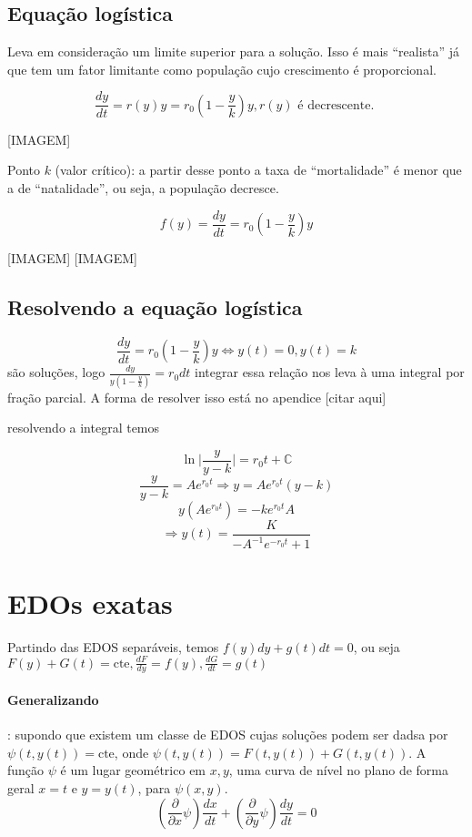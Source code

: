 \subsection{Equação logística}
Leva em consideração um limite superior para a solução. Isso é mais ``realista'' já que tem um fator
limitante como população cujo crescimento é proporcional.

\[ \frac{dy}{dt}= r(y) y = r_0 \left( 1 - \frac{y}{k} \right)y, r(y) \text{ é decrescente. }\]

[IMAGEM] 

Ponto \( k \) (valor crítico): a partir desse ponto a taxa de ``mortalidade'' é menor que a
de ``natalidade'', ou seja, a população decresce.

\[ f(y) = \frac{dy}{dt} = r_0 \left( 1 - \frac{y}{k} \right)y \]

[IMAGEM] [IMAGEM]

\subsection{Resolvendo a equação logística}
\[ \frac{dy}{dt} = r_0 \left( 1 - \frac{y}{k} \right)y  \Leftrightarrow y(t) = 0, y(t) = k \]
são soluções, logo \( \frac{dy}{y \left( 1 - \frac{y}{k} \right)}  = r_0 dt \)
integrar essa relação nos leva à uma integral por fração parcial. A forma de resolver
isso está no apendice [citar aqui]

resolvendo a integral temos

\[ \ln \bigg| \frac{y}{y- k} \bigg | = r_0 t + \mathbb{C} \]
\[ \frac{y}{y-k} = A e^{r_0 t} \Rightarrow y = A e^{r_0 t} (y - k) \]
\[ y \left( A e^{r_0 t} \right) = - k e^{r_0 t} A \]
\[ \Rightarrow y(t) = \frac{K}{-A^{-1} e^{-r_0 t} + 1} \]

\section{EDOs exatas}

Partindo das EDOS separáveis, temos \( f(y)dy + g(t) dt = 0 \),
ou seja \( F(y) + G(t) = \text{cte}, \frac{dF}{dy} = f(y), \frac{dG}{dt} = g(t) \) 

\paragraph{Generalizando}: supondo que existem um classe de EDOS cujas soluções podem ser dadsa por
 \( \psi (t, y(t)) = \text{cte} \), onde \( \psi(t, y(t)) = F(t, y(t)) + G(t, y(t)) \). A função
 \( \psi \) é um lugar geométrico em \( x, y \), uma curva de nível no plano de forma geral
 \( x = t \)  e \( y = y(t) \), para \( \psi(x, y) \).
 \[ \left( \frac{\partial }{\partial x} \psi \right) \frac{dx}{dt} + \left( \frac{\partial }{\partial y} \psi \right)\frac{d y }{d t} = 0 \]

